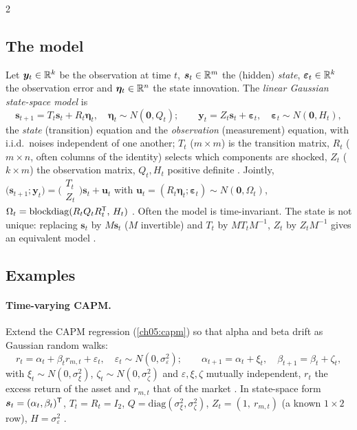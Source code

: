 \begin{paracol}{2}
\subsection{The model}\label{ch09:sec-ss-model}
Let $\bm y_t\in\mathbb{R}^k$ be the observation at time $t$, $\bm s_t\in\mathbb{R}^m$ the (hidden) \emph{state}, $\bm\varepsilon_t\in\mathbb{R}^k$ the observation error and
$\bm\eta_t\in\mathbb{R}^n$ the state innovation. The \emph{linear Gaussian state-space model} is
\begin{equation}\label{ch09:eq-ss}
  \bm s_{t+1}=T_t\bm s_t+R_t\bm\eta_t,\quad \bm\eta_t\sim N(\bm0,Q_t);\qquad
  \bm y_t=Z_t\bm s_t+\bm\varepsilon_t,\quad \bm\varepsilon_t\sim N(\bm0,H_t),
\end{equation}
the \emph{state} (transition) equation and the \emph{observation} (measurement) equation, with i.i.d.\ noises independent of one another;
$T_t$ ($m\times m$) is the transition matrix, $R_t$ ($m\times n$, often columns of the identity) selects which components are shocked, $Z_t$ ($k\times m$) the observation
matrix, $Q_t,H_t$ positive definite . Jointly,
$\bigl(\bm s_{t+1};\bm y_t\bigr)=\bigl(\begin{smallmatrix}T_t\\ Z_t\end{smallmatrix}\bigr)\bm s_t+\bm u_t$ with
$\bm u_t=(R_t\bm\eta_t;\bm\varepsilon_t)\sim N(\bm0,\Omega_t)$, $\Omega_t=\mathrm{blockdiag}(R_tQ_tR_t^{\mathsf T},\,H_t)$ . Often the
model is time-invariant. The state is not unique: replacing $\bm s_t$ by $M\bm s_t$ ($M$ invertible) and $T_t$ by $MT_tM^{-1}$, $Z_t$ by $Z_tM^{-1}$ gives an equivalent model
.

\subsection{Examples}\label{ch09:sec-ss-ex}
\paragraph{Time-varying CAPM.} Extend the CAPM regression (\cref{ch05:capm}) so that alpha and beta drift as Gaussian random walks:
\[
  r_t=\alpha_t+\beta_tr_{m,t}+\varepsilon_t,\quad \varepsilon_t\sim N(0,\sigma_\varepsilon^2);\qquad
  \alpha_{t+1}=\alpha_t+\xi_t,\quad\beta_{t+1}=\beta_t+\zeta_t,
\]
with $\xi_t\sim N(0,\sigma_\xi^2)$, $\zeta_t\sim N(0,\sigma_\zeta^2)$ and $\varepsilon,\xi,\zeta$ mutually independent, $r_t$ the excess return of the asset and $r_{m,t}$ that of the market
. In state-space form $\bm s_t=(\alpha_t,\beta_t)^{\mathsf T}$, $T_t=R_t=I_2$, $Q=\mathrm{diag}(\sigma_\xi^2,\sigma_\zeta^2)$,
$Z_t=(1,\ r_{m,t})$ (a known $1\times2$ row), $H=\sigma_\varepsilon^2$ .


\end{paracol}
